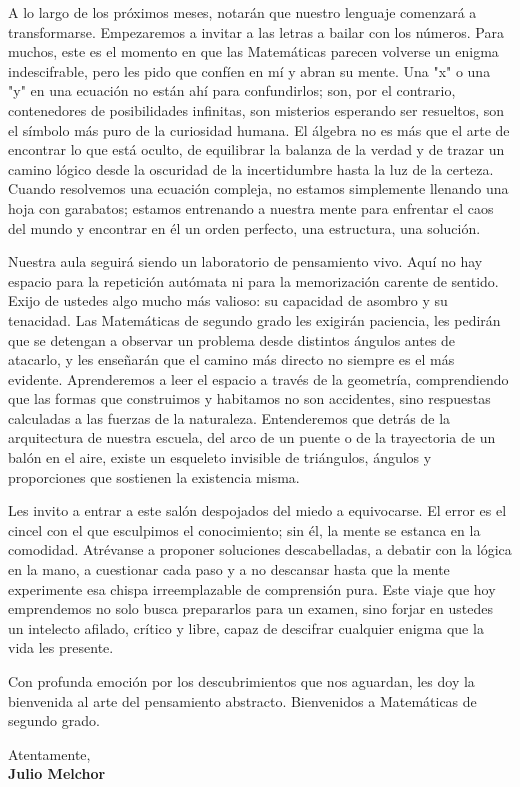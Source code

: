 \documentclass[11pt]{report}
\begin{document}
\begin{titlepage}
\vspace{0.7em}

A lo largo de los próximos meses, notarán que nuestro lenguaje comenzará a transformarse. Empezaremos a invitar a las letras a bailar con los números. Para muchos, este es el momento en que las Matemáticas parecen volverse un enigma indescifrable, pero les pido que confíen en mí y abran su mente. Una "x" o una "y" en una ecuación no están ahí para confundirlos; son, por el contrario, contenedores de posibilidades infinitas, son misterios esperando ser resueltos, son el símbolo más puro de la curiosidad humana. El álgebra no es más que el arte de encontrar lo que está oculto, de equilibrar la balanza de la verdad y de trazar un camino lógico desde la oscuridad de la incertidumbre hasta la luz de la certeza. Cuando resolvemos una ecuación compleja, no estamos simplemente llenando una hoja con garabatos; estamos entrenando a nuestra mente para enfrentar el caos del mundo y encontrar en él un orden perfecto, una estructura, una solución.

\vspace{0.7em}

Nuestra aula seguirá siendo un laboratorio de pensamiento vivo. Aquí no hay espacio para la repetición autómata ni para la memorización carente de sentido. Exijo de ustedes algo mucho más valioso: su capacidad de asombro y su tenacidad. Las Matemáticas de segundo grado les exigirán paciencia, les pedirán que se detengan a observar un problema desde distintos ángulos antes de atacarlo, y les enseñarán que el camino más directo no siempre es el más evidente. Aprenderemos a leer el espacio a través de la geometría, comprendiendo que las formas que construimos y habitamos no son accidentes, sino respuestas calculadas a las fuerzas de la naturaleza. Entenderemos que detrás de la arquitectura de nuestra escuela, del arco de un puente o de la trayectoria de un balón en el aire, existe un esqueleto invisible de triángulos, ángulos y proporciones que sostienen la existencia misma.

\vspace{0.7em}

Les invito a entrar a este salón despojados del miedo a equivocarse. El error es el cincel con el que esculpimos el conocimiento; sin él, la mente se estanca en la comodidad. Atrévanse a proponer soluciones descabelladas, a debatir con la lógica en la mano, a cuestionar cada paso y a no descansar hasta que la mente experimente esa chispa irreemplazable de comprensión pura. Este viaje que hoy emprendemos no solo busca prepararlos para un examen, sino forjar en ustedes un intelecto afilado, crítico y libre, capaz de descifrar cualquier enigma que la vida les presente.

\vspace{0.7em}

Con profunda emoción por los descubrimientos que nos aguardan, les doy la bienvenida al arte del pensamiento abstracto. Bienvenidos a Matemáticas de segundo grado.

\vspace{0.7em}

\raggedright Atentamente,\\
\textbf{Julio Melchor}

\end{titlepage}
\end{document}
